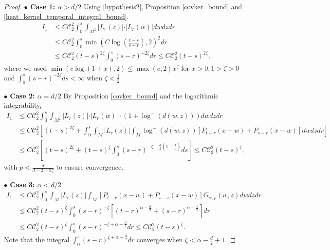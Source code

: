 \documentclass[12pt]{amsart}
\numberwithin{equation}{section}
\newcommand{\1}{\mathbf{1}}
\begin{document}
\begin{proof}
\textbf{$\bullet$ Case 1: $\alpha>d/2$}
Using \eqref{hypothesis2}, Proposition \ref{covker_bound} and \eqref{heat_kernel_temporal_integral_bound},
\begin{equation*}
\begin{split}
I_1&\leq C\mathcal{C}_2^2
\int_0^s\int_{M^2}\vert L_r(z)\vert\cdot \vert L_r(w)\vert dwdzdr\\
&\leq C\mathcal{C}_2^2\int_0^s\min\left(C\log\left(\frac{t-r}{s-r}\right),2\right)^2dr\\
&\leq C\mathcal{C}_2^2(t-s)^{2\zeta}\int_0^s(s-r)^{-2\zeta}dr\leq C\mathcal{C}_2^2(t-s)^{2\zeta},
\end{split}
\end{equation*}
where we used $\min(c\log(1+x),2)\leq\max(c,2)x^\zeta$ for $x>0, 1>\zeta>0$ and $\int_0^s(s-r)^{-2\zeta}ds<\infty$ when $\zeta<\frac{1}{2}$.

\textbf{$\bullet$ Case 2: $\alpha=d/2$}
By Proposition \ref{covker_bound} and the logarithmic integrability,
\begin{equation*}
    \begin{split}
I_1&\leq C\mathcal{C}_2^2
\int_0^s\int_{M^2}\vert L_r(z)\vert\cdot \vert L_r(w)\vert \cdot(1+\log^-(d(w,z))) dwdzdr\\
&\leq C\mathcal{C}_2^2\left[(t-s)^{2\zeta}+\int_0^s\int_M\vert L_r(z)\vert\int_M\log^-(d(w,z))[P_{t-r}(x-w)+P_{s-r}(x-w)]dwdzdr\right]\\
&\leq C\mathcal{C}_2^2\left[(t-s)^{2\zeta}+(t-s)^{\zeta}\int_0^s(s-r)^{-\zeta-\frac{d}{2}(1-\frac{1}{p})}ds\right]\leq C\mathcal{C}_2^2(t-s)^{\zeta},
\end{split}
\end{equation*}
with $p<\frac{d}{d-2+2\zeta}$ to ensure convergence.

\textbf{$\bullet$ Case 3: $\alpha<d/2$}
\begin{equation*}
\begin{split}
        I_1&\leq C\mathcal{C}_2^2\int_0^s\int_{M}\vert L_r(z)\vert\int_M[P_{t-r}(x-w)+P_{s-r}(x-w)]G_{\alpha,\rho}(w,z)dwdzdr\\
        &\leq C\mathcal{C}_2^2(t-s)^{\zeta}\int_0^s(s-r)^{-\zeta}\left[(t-r)^{\alpha-\frac{d}{2}}+(s-r)^{\alpha-\frac{d}{2}}\right]dr\\
        &\leq C\mathcal{C}_2^2(t-s)^{\zeta}\int_0^s(s-r)^{-\zeta+\alpha-\frac{d}{2}}dr\leq C\mathcal{C}_2^2(t-s)^{\zeta}.
\end{split}
\end{equation*}
Note that the integral $\int_0^s(s-r)^{\zeta+\alpha-\frac{d}{2}}dr$ converges when $\zeta<\alpha-\frac{d}{2}+1$. 


\end{proof}
\end{document}
